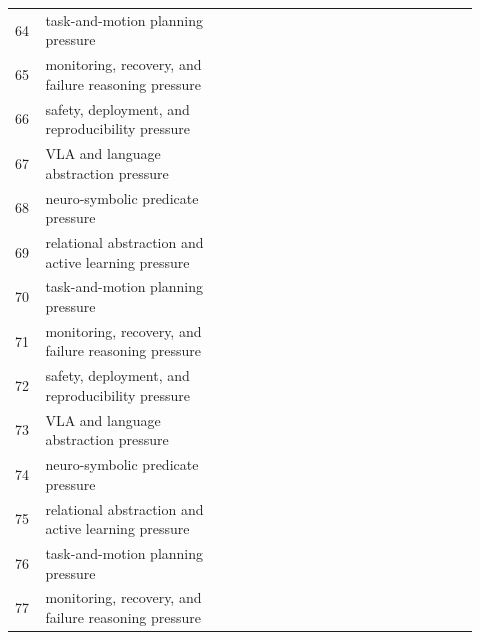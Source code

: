 \documentclass[11pt]{article}
\begin{document}
\begin{longtable}{p{0.06\linewidth}p{0.38\linewidth}p{0.48\linewidth}}
64 & task-and-motion planning pressure & \citep{burbridge2012learning190,shankar2024abstract191,boer2025design192} \\
65 & monitoring, recovery, and failure reasoning pressure & \citep{rana2023sayplan193,yoshikawa2023developing194,joublin2023copal195} \\
66 & safety, deployment, and reproducibility pressure & \citep{hunttaliilaogwa2024against196,hong2024multiply197,du2023video198} \\
67 & VLA and language abstraction pressure & \citep{xie2023languageconditioned199,yang2023on200,kannan2023smartllm201} \\
68 & neuro-symbolic predicate pressure & \citep{xie2023translating202,lee2023systemlevel203,zhang2025embodied204} \\
69 & relational abstraction and active learning pressure & \citep{liu2025investigation205,lorangndbuild206,fan2026navla2207} \\
70 & task-and-motion planning pressure & \citep{dhole2025aipowered208,shah2022using209,zhou2025rt2210} \\
71 & monitoring, recovery, and failure reasoning pressure & \citep{sun2026dadue211,tang2026sltp212,du2023video213} \\
72 & safety, deployment, and reproducibility pressure & \citep{feng2024task214,kumar2026openworld215,kobilov2025automatic216} \\
73 & VLA and language abstraction pressure & \citep{boya2025large217,certo2025large218,bonda2025hoverbvi219} \\
74 & neuro-symbolic predicate pressure & \citep{han2025traffic220,halacheva2025gaussianvlm221,choi2025find222} \\
75 & relational abstraction and active learning pressure & \citep{singh2025llmrspf223,paradowskindthe224,murata2026multirobot225} \\
76 & task-and-motion planning pressure & \citep{li2025from226,sun2025llapa227,kantaros2020reactive228} \\
77 & monitoring, recovery, and failure reasoning pressure & \citep{mcenteeatalianis2016a229,bamgbo2003a230} \\
\bottomrule
\end{longtable}



\end{document}
